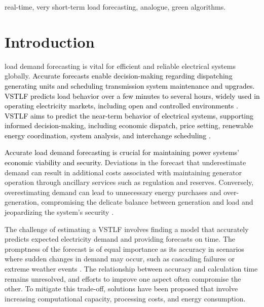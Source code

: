 \documentclass[journal, twoside]{IEEEtran}
\begin{document}
\begin{IEEEkeywords}
real-time, very short-term load forecasting, analogue, green algorithms.
\end{IEEEkeywords}







\IEEEpeerreviewmaketitle


\section{Introduction}
\label{sec:Introduction}

 load demand forecasting is vital for efficient and reliable electrical systems globally. \textcolor{black}{Accurate forecasts enable decision-making regarding dispatching generating units and scheduling transmission system maintenance and upgrades. \ac{VSTLF} predicts load behavior over a few minutes to several hours, widely used in operating electricity markets, including open and controlled environments \cite{Dannecker2015}. \ac{VSTLF} aims to predict the near-term behavior of electrical systems, supporting informed decision-making, including economic dispatch, price setting, renewable energy coordination, system analysis, and interchange scheduling \cite{Fan1994}.}


\textcolor{black}{Accurate load demand forecasting is crucial for maintaining power systems' economic viability and security.}
Deviations in the forecast that underestimate demand can result in additional costs associated with maintaining generator operation through ancillary services such as regulation and reserves. Conversely, overestimating demand can lead to unnecessary energy purchases and over-generation, compromising the delicate balance between generation and load and jeopardizing the system's security \cite{Yadav2023}. 

The challenge of estimating a \ac{VSTLF} involves finding a model that accurately predicts expected electricity demand and providing forecasts on time. The promptness of the forecast is of equal importance as its accuracy in scenarios where sudden changes in demand may occur, such as cascading failures or extreme weather events \cite{CascadeFailures}. The relationship between accuracy and calculation time remains unresolved, and efforts to improve one aspect often compromise the other. To mitigate this trade-off, solutions have been proposed that involve increasing computational capacity, processing costs, and energy consumption.
\end{document}
